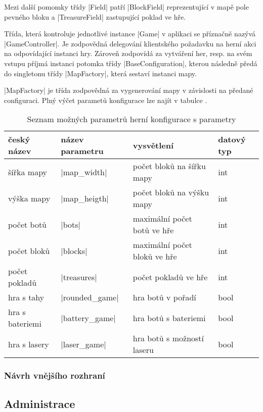 Mezi další pomomky třídy \ic|Field| patří \ic|BlockField| reprezentující v mapě pole pevného bloku a \ic|TreasureField| zastupující poklad ve hře.

Třída, která kontroluje jednotlivé instance \ic|Game| v aplikaci se příznačně nazývá \ic|GameController|. Je zodpovědná delegování klientského požadavku na herní akci na odpovídající instanci hry. Zároveň zodpovídá za vytváření her, resp. na svém vstupu příjmá instanci potomka třídy \ic|BaseConfiguration|, kterou následně předá do singletonu třídy \ic|MapFactory|, která sestaví instanci mapy.

\ic|MapFactory| je třída zodpovědná za vygenerování mapy v závislosti na předané configuraci. Plný výčet parametů konfigurace lze najít v tabulce .

\begin{table}[H]
	\centering
	\begin{tabular}{ l | l | l | l }
		český název & název parametru & vysvětlení & datový typ \\
		\hline
		šířka mapy & \ic|map_width| & počet bloků na šířku mapy & int \\
		výška mapy & \ic|map_heigth| & počet bloků na výšku mapy & int \\
		počet botů & \ic|bots| & maximální počet botů ve hře & int \\
		počet bloků & \ic|blocks| & maximální počet bloků ve hře & int \\
		počet pokladů & \ic|treasures| & počet pokladů ve hře & int \\
		hra s tahy & \ic|rounded_game| & hra botů v pořadí & bool \\
		hra s bateriemi & \ic|battery_game| & hra botů s bateriemi & bool \\
		hra s lasery & \ic|laser_game| & hra botů s možností laseru & bool \\
	\end{tabular}
	\caption{Seznam možných parametrů herní konfigurace s parametry}
	\label{table:conf-parameters}
\end{table}

\subsubsection{Návrh vnějšího rozhraní}

\subsection{Administrace}


